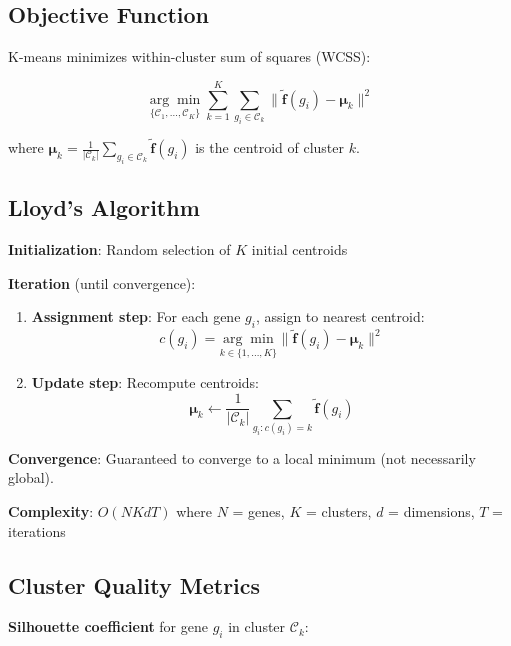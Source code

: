 \documentclass[12pt,letterpaper]{article}
\theoremstyle{definition}
\theoremstyle{remark}
\begin{document}
\subsection{Objective Function}

K-means minimizes within-cluster sum of squares (WCSS):

\begin{equation}
\underset{\{\mathcal{C}_1, \ldots, \mathcal{C}_K\}}{\arg\min} \sum_{k=1}^K \sum_{g_i \in \mathcal{C}_k} \|\tilde{\mathbf{f}}(g_i) - \boldsymbol{\mu}_k\|^2
\end{equation}

where $\boldsymbol{\mu}_k = \frac{1}{|\mathcal{C}_k|}\sum_{g_i \in \mathcal{C}_k} \tilde{\mathbf{f}}(g_i)$ is the centroid of cluster $k$.

\subsection{Lloyd's Algorithm}

\textbf{Initialization}: Random selection of $K$ initial centroids

\textbf{Iteration} (until convergence):
\begin{enumerate}
    \item \textbf{Assignment step}: For each gene $g_i$, assign to nearest centroid:
    \begin{equation}
    c(g_i) = \underset{k \in \{1,\ldots,K\}}{\arg\min} \|\tilde{\mathbf{f}}(g_i) - \boldsymbol{\mu}_k\|^2
    \end{equation}
    
    \item \textbf{Update step}: Recompute centroids:
    \begin{equation}
    \boldsymbol{\mu}_k \leftarrow \frac{1}{|\mathcal{C}_k|} \sum_{g_i : c(g_i)=k} \tilde{\mathbf{f}}(g_i)
    \end{equation}
\end{enumerate}

\textbf{Convergence}: Guaranteed to converge to a local minimum (not necessarily global).

\textbf{Complexity}: $O(NKdT)$ where $N$ = genes, $K$ = clusters, $d$ = dimensions, $T$ = iterations

\subsection{Cluster Quality Metrics}

\textbf{Silhouette coefficient} for gene $g_i$ in cluster $\mathcal{C}_k$:
\end{document}

